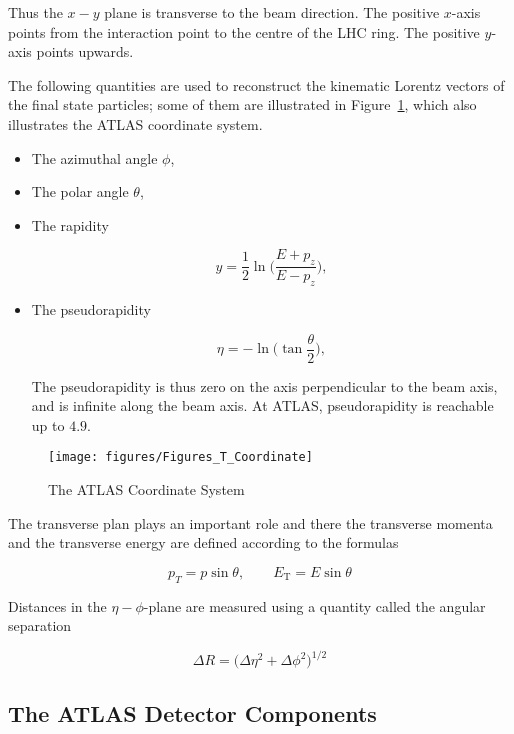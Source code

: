Thus the $x-y$ plane is transverse to the beam direction. The positive $x$-axis
points from the interaction point to the centre of the LHC ring. The positive
$y$-axis points upwards.

The following quantities are used to reconstruct the kinematic Lorentz vectors
of the final state particles; some of them are illustrated in
Figure~\ref{f:atlasc}, which also illustrates the ATLAS coordinate system.


\begin{itemize}
	\item The azimuthal angle $\phi$,
	\item The polar angle $\theta$,
	\item The rapidity

	      $$
		      y = \frac{1}{2}\ln\bigg( \frac{E + p_z}{E - p_z}\bigg),
	      $$

	\item The pseudorapidity

	      $$
		      \eta = -\ln\bigg( \tan \frac{\theta}{2}\bigg),
	      $$

	      The pseudorapidity is thus zero on the axis perpendicular to the beam axis, and
	      is infinite along the beam axis. At ATLAS, pseudorapidity is reachable up to
	      $4.9$.

\end{itemize}

\begin{figure}[H]
	\texttt{[image: figures/Figures\_T\_Coordinate]}
	\centering
	\caption{The ATLAS Coordinate System~\cite{}}
	\label{f:atlasc}
\end{figure}


The transverse plan plays an important role and there the transverse momenta
and the transverse energy are defined according to the formulas

$$p_T = p\sin\theta, \qquad E_{\text{T}} = E\sin\theta $$

Distances in the $\eta-\phi$-plane are measured using a quantity called the
angular separation

\begin{equation}\label{eq:angulardr}
	\Delta R = \big(\Delta \eta^2 + \Delta \phi^2\big)^{1/2}
\end{equation}

\subsection{The ATLAS Detector Components}




